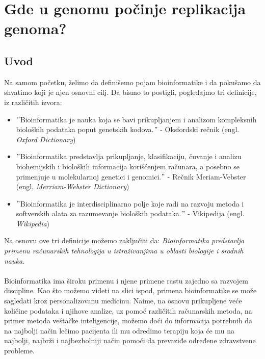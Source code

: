 \chapter{Gde u genomu počinje replikacija genoma?}
\setbookcodestyle

\section{Uvod}
\label{sec:uvod}

Na samom početku, želimo da definišemo pojam bioinformatike i da pokušamo da shvatimo koji je njen osnovni cilj. Da bismo to postigli, pogledajmo tri definicije, iz različitih izvora:

\begin{itemize}
  \item $"$Bioinformatika je nauka koja se bavi prikupljanjem i analizom kompleksnih bioloških podataka poput genetskih kodova.$"$ - Oksfordski rečnik (engl. \textit{Oxford Dictionary})
  \item $"$Bioinformatika predstavlja prikupljanje, klasifikaciju, čuvanje i analizu biohemijskih i bioloških informacija korišćenjem računara, a posebno se primenjuje u molekularnoj genetici i genomici.$"$ - Rečnik Meriam-Vebster (engl. \textit{Merriam-Webster Dictionary}) 
 \item $"$Bioinformatika je interdisciplinarno polje koje radi na razvoju metoda i softverskih alata za razumevanje bioloških podataka.$"$ - Vikipedija (engl. \textit{Wikipedia}) 
\end{itemize}

\noindent Na osnovu ove tri definicije možemo zaključiti da: \textit{Bioinformatika predstavlja primenu računarskih tehnologija u istraživanjima u oblasti biologije i srodnih nauka.}\\\\
Bioinformatika ima široku primenu i njene primene rastu zajedno sa razvojem discipline. Kao što možemo videti na slici ispod, primena bioinformatike se može sagledati kroz personalizovanu medicinu. Naime, na osnovu prikupljene veće količine podataka i njihove analize, uz pomoć različitih računarskih metoda, na primer metoda veštačke inteligencije, možemo doći do informacija potrebnih da na najbolji način lečimo pacijenta ili mu odredimo terapiju koja će mu na najbolji, najbrži i najbezbolniji način pomoći da prevaziđe određene zdravstvene probleme.  \\

